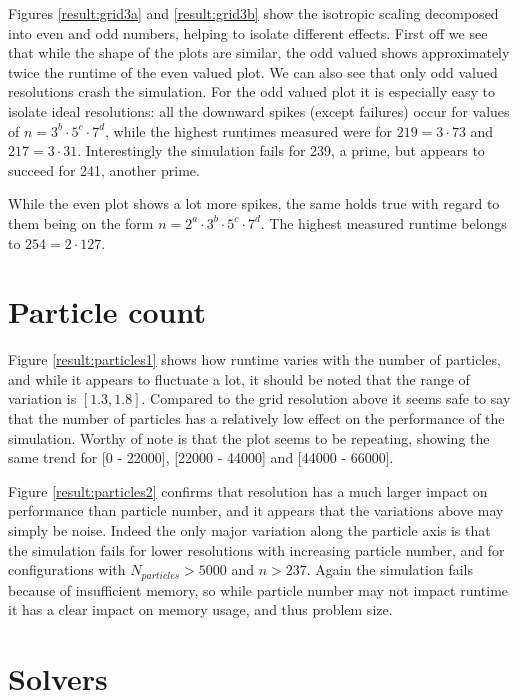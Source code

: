 Figures \ref{result:grid3a} and \ref{result:grid3b} show the isotropic scaling decomposed into even and odd numbers, helping
to isolate different effects. First off we see that while the shape of the plots are similar, the odd valued shows
approximately twice the runtime of the even valued plot. We can also see that only odd valued resolutions crash the
simulation. For the odd valued plot it is especially easy to isolate ideal resolutions: all the downward spikes (except
failures) occur for values of $n=3^b \cdot 5^c \cdot 7^d$, while the highest runtimes measured were for $219 = 3 \cdot 73$
and $217 = 3 \cdot 31$. Interestingly the simulation fails for 239, a prime, but appears to succeed for 241, another prime.

While the even plot shows a lot more spikes, the same holds true with regard to them being on the form $n=2^a\cdot 3^b \cdot 5^c \cdot 7^d$.
The highest measured runtime belongs to $254 = 2 \cdot 127$.

\section{Particle count}

Figure \ref{result:particles1} shows how runtime varies with the number of particles, and while it appears to fluctuate
a lot, it should be noted that the range of variation is $[1.3, 1.8]$. Compared to the grid resolution above it seems
safe to say that the number of particles has a relatively low effect on the performance of the simulation. Worthy of note
is that the plot seems to be repeating, showing the same trend for [0 - 22000], [22000 - 44000] and [44000 - 66000].

Figure \ref{result:particles2} confirms that resolution has a much larger impact on performance than particle number, and it
appears that the variations above may simply be noise. Indeed the only major variation along the particle axis is that
the simulation fails for lower resolutions with increasing particle number, and for configurations with $N_{particles}>5000$
and $n>237$. Again the simulation fails because of insufficient memory, so while particle number may not impact runtime
it has a clear impact on memory usage, and thus problem size.

\section{Solvers}

